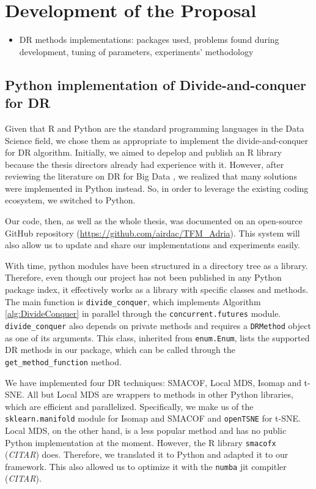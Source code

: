 \section{Development of the Proposal}

\begin{itemize}
    \item DR methods implementations: packages used, problems found during development, tuning of parameters, experiments' methodology
\end{itemize}

\subsection{Python implementation of Divide-and-conquer for DR}

Given that R and Python are the standard programming languages in the Data Science field, we chose them as appropriate to implement the divide-and-conquer for DR algorithm. Initially, we aimed to depelop and publish an R library because the thesis directors already had experience with it. However, after reviewing the literature on DR for Big Data \cite{Reichmann2024}, we realized that many solutions were implemented in Python instead. So, in order to leverage the existing coding ecosystem, we switched to Python.

Our code, then, as well as the whole thesis, was documented on an open-source GitHub repository (\href{https://github.com/airdac/TFM_Adria}{https://github.com/airdac/TFM\_Adria}). This system will also allow us to update and share our implementations and experiments easily.

With time, python modules have been structured in a directory tree as a library. Therefore, even though our project has not been published in any Python package index, it effectively works as a library with specific classes and methods. The main function is \verb|divide_conquer|, which implements Algorithm \ref{alg:DivideConquer} in parallel through the \verb|concurrent.futures| module. \verb|divide_conquer| also depends on private methods and requires a \verb|DRMethod| object as one of its arguments. This class, inherited from \verb|enum.Enum|, lists the supported DR methods in our package, which can be called through the \verb|get_method_function| method.

We have implemented four DR techniques: SMACOF, Local MDS, Isomap and t-SNE. All but Local MDS are wrappers to methods in other Python libraries, which are efficient and parallelized. Specifically, we make us of the \verb|sklearn.manifold| module \cite{Pedregosa2011} for Isomap and SMACOF and \verb|openTSNE| \cite{Poličar2023} for t-SNE. Local MDS, on the other hand, is a less popular method and has no public Python implementation at the moment. However, the R library \verb|smacofx| (\textit{CITAR}) does. Therefore, we translated it to Python and adapted it to our framework. This also allowed us to optimize it with the \verb|numba| jit compitler (\textit{CITAR}).

